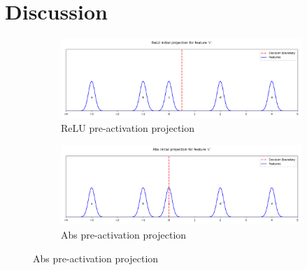 \section{Discussion}

\begin{figure}[t]
    \centering

    \begin{subfigure}[b]{0.49\textwidth}
    \centering
    \includegraphics[width=\textwidth]{images/activation_demo_relu_pre}
    \caption{ReLU pre-activation projection}
    \label{fig:relu_pre}
    \end{subfigure}
    \hfill
    \begin{subfigure}[b]{0.49\textwidth}
    \centering
    \includegraphics[width=\textwidth]{images/activation_demo_abs_pre}
    \caption{Abs pre-activation projection}
    \label{fig:abs_pre}
    \end{subfigure}


\end{figure}
